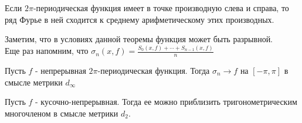 \documentclass{article}
\begin{document}
	\begin{theorem} 
		Если $2\pi$-периодическая функция имеет в точке производную слева и справа, то ряд Фурье в ней сходится к среднему арифметическому этих производных.
	\end{theorem}

	Заметим, что в условиях данной теоремы функция может быть разрывной.\\
	
	Еще раз напомним, что $\sigma_n(x,f)=\frac{S_0(x, f)+\cdots+S_{n-1}(x, f)}{n}$
	
	\begin{theorem} 
		Пусть $f$ - непрерывная $2\pi$-периодическая функция. Тогда $\sigma_n \rightarrow f$ на $[-\pi, \pi]$ в смысле метрики $d_{\infty}$
	\end{theorem}

	\begin{theorem} 
		Пусть $f$ - кусочно-непрерывная. Тогда ее можно приблизить тригонометрическим многочленом в смысле метрики $d_2$.
	\end{theorem}



	

	\setcounter{section}{13}
\end{document}
